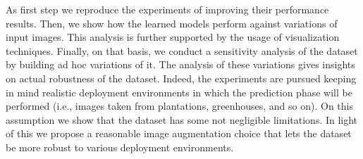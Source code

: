 As first step we reproduce the experiments of \cite{ref11} improving their performance results. Then, we show how the learned models perform against variations of input images. This analysis is further supported by the usage of visualization techniques. Finally, on that basis, we conduct a sensitivity analysis of the dataset by building ad hoc variations of it. The analysis of these variations gives insights on actual robustness of the dataset. Indeed, the experiments are pursued keeping in mind realistic deployment environments in which the prediction phase will be performed (i.e., images taken from plantations, greenhouses, and so on). On this assumption we show that the dataset has some not negligible limitations. In light of this we propose a reasonable image augmentation choice that lets the dataset be more robust to various deployment environments.